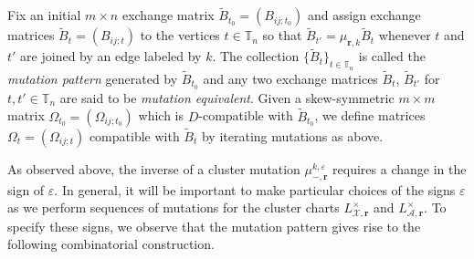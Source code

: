 \documentclass{amsart}
\numberwithin{equation}{section}
\newcommand{\bfr}{{\boldsymbol{r}}}
\newcommand{\cA}{\mathcal{A}}
\newcommand{\cX}{\mathcal{X}}
\newcommand{\TT}{\mathbb{T}}
\begin{document}
Fix an initial $m\times n$ exchange matrix $\tilde B_{t_0}=(B_{ij;t_0})$ and assign exchange matrices $\tilde B_t=(B_{ij;t})$ to the vertices $t\in\TT_n$ so that $\tilde B_{t'}=\mu_{\bfr,k}\tilde B_t$ whenever $t$ and $t'$ are joined by an edge labeled by $k$.
The collection $\{\tilde B_t\}_{t\in\TT_n}$ is called the \emph{mutation pattern} generated by $\tilde B_{t_0}$ and any two exchange matrices $\tilde B_t$, $\tilde B_{t'}$ for $t,t'\in\TT_n$ are said to be \emph{mutation equivalent}.
Given a skew-symmetric $m\times m$ matrix $\Omega_{t_0}=(\Omega_{ij;t_0})$ which is $D$-compatible with $\tilde B_{t_0}$, we define matrices $\Omega_t=(\Omega_{ij;t})$ compatible with $\tilde B_t$ by iterating mutations as above.

As observed above, the inverse of a cluster mutation $\mu_{-,\bfr}^{k,\varepsilon}$ requires a change in the sign of $\varepsilon$.
In general, it will be important to make particular choices of the signs $\varepsilon$ as we perform sequences of mutations for the cluster charts $L^\times_{\cX,\bfr}$ and $L^\times_{\cA,\bfr}$.
To specify these signs, we observe that the mutation pattern gives rise to the following combinatorial construction.
\end{document}
